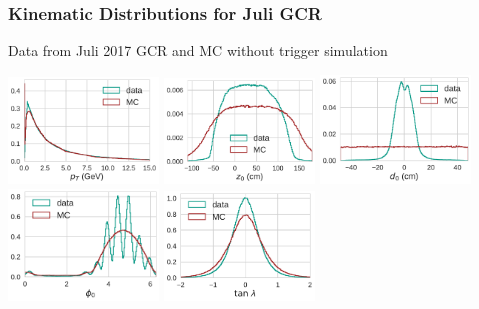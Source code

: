 \documentclass[18pt]{beamer}
\begin{document}
\begin{frame}
  \frametitle{Kinematic Distributions for Juli GCR}
  Data from Juli 2017 GCR and MC without trigger simulation
  \begin{center}
    \includegraphics[width=0.3\textwidth]{figures/distributions/gcr_juli_2017_pt_distribution_normed=True.pdf}
    \includegraphics[width=0.3\textwidth]{figures/distributions/gcr_juli_2017_z0_distribution_normed=True.pdf}
    \includegraphics[width=0.3\textwidth]{figures/distributions/gcr_juli_2017_d0_distribution_normed=True.pdf}\\
    \includegraphics[width=0.3\textwidth]{figures/distributions/gcr_juli_2017_phi0_distribution_normed=True.pdf}
    \includegraphics[width=0.3\textwidth]{figures/distributions/gcr_juli_2017_tan_lambda_distribution_normed=True.pdf}
  \end{center}
\end{frame}
  
\end{document}
